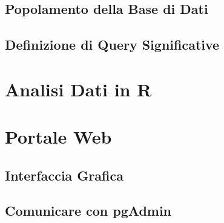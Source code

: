\documentclass{article}
\begin{document}
\subsection{Popolamento della Base di Dati}
\subsection{Definizione di Query Significative}




\clearpage
\section{Analisi Dati in R}




\clearpage
\section{Portale Web}
\subsection{Interfaccia Grafica}
\subsection{Comunicare con pgAdmin}
\end{document}
